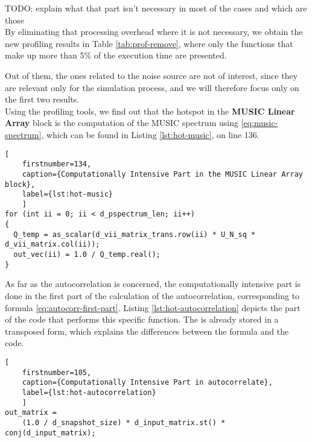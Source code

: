 TODO: explain what that part isn't necessary in most of the cases and which are
those \\

By eliminating that processing overhead where it is not necessary, we obtain the
new profiling results in Table \ref{tab:prof-remove}, where only the functions
that make up more than 5\% of the execution time are presented. 



Out of them, the ones related to the noise source are not of interest, since
they are relevant only for the simulation process, and we will therefore focus
only on the first two results. \\

Using the profiling tools, we find out that the hotspot in the \textbf{MUSIC
Linear Array} block is the computation of the MUSIC spectrum using
\eqref{eq:music-spectrum}, which can be found in Listing \ref{lst:hot-music}, on
line 136. \\

\begin{minipage}{\linewidth}
\begin{lstlisting}[
	firstnumber=134,
	caption={Computationally Intensive Part in the MUSIC Linear Array block},
	label={lst:hot-music}
    ]
for (int ii = 0; ii < d_pspectrum_len; ii++)
{
  Q_temp = as_scalar(d_vii_matrix_trans.row(ii) * U_N_sq * d_vii_matrix.col(ii));
  out_vec(ii) = 1.0 / Q_temp.real();
}
\end{lstlisting}
\end{minipage}

As far as the autocorrelation is concerned, the computationally intensive part
is done in the first part of the calculation of the autocorrelation,
corresponding to formula \eqref{eq:autocorr-first-part}. 
Listing \ref{lst:hot-autocorrelation} depicts the part of the code
that performs this specific function. The  is already
stored in a transposed form, which explains the differences between the formula
and the code. \\

\begin{minipage}{\linewidth}
\begin{lstlisting}[
	firstnumber=105,
	caption={Computationally Intensive Part in autocorrelate},
	label={lst:hot-autocorrelation}
    ]
out_matrix =
    (1.0 / d_snapshot_size) * d_input_matrix.st() * conj(d_input_matrix);
\end{lstlisting}
\end{minipage}

